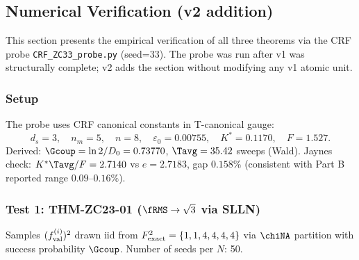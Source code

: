 \documentclass[12pt, a4paper]{article}
\begin{document}
\subsection{Numerical Verification (v2 addition)}
\label{sec:probe}

This section presents the empirical verification of all three
theorems via the CRF probe \texttt{CRF\_ZC33\_probe.py}
(seed=33). The probe was run after v1 was structurally complete;
v2 adds the section without modifying any v1 atomic unit.

\subsubsection{Setup}

The probe uses CRF canonical constants in T-canonical gauge:
\[
  d_s = 3,\quad n_m = 5,\quad n = 8,\quad
  \varepsilon_0 = 0.00755,\quad K^* = 0.1170,\quad F = 1.527.
\]
Derived: $\Gcoup = \ln 2/D_0 = 0.73770$, $\Tavg = 35.42$ sweeps
(Wald). Jaynes check: $K^*\Tavg/F = 2.7140$ vs $e = 2.7183$,
gap $0.158\%$ (consistent with Part B reported range
$0.09$--$0.16\%$).

\subsubsection{Test 1: THM-ZC23-01 ($\fRMS\to\sqrt{3}$ via SLLN)}

Samples $(f_{\rm val}^{(i)})^2$ drawn iid from $F_{\rm exact}^2
= \{1,1,4,4,4,4\}$ via $\chiNA$ partition with success
probability $\Gcoup$. Number of seeds per $N$: 50.
\end{document}
